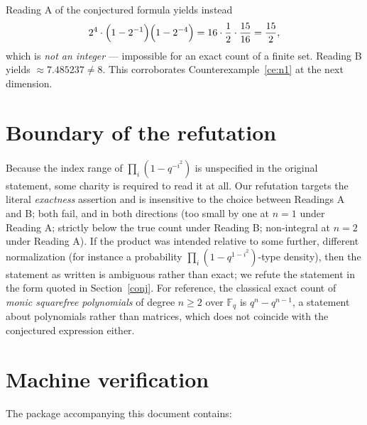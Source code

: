 \documentclass[11pt]{article}
\newcommand{\Fq}{\mathbb{F}_q}
\begin{document}
Reading A of the conjectured formula yields instead
\[
2^{4}\cdot\Bigl(1 - 2^{-1}\Bigr)\Bigl(1 - 2^{-4}\Bigr)
= 16 \cdot \frac12 \cdot \frac{15}{16} = \frac{15}{2},
\]
which is \emph{not an integer} --- impossible for an exact count of a finite
set. Reading B yields $\approx 7.485237 \neq 8$. This corroborates
Counterexample~\ref{ce:n1} at the next dimension.

\section{Boundary of the refutation}

Because the index range of $\prod_i(1 - q^{-i^2})$ is unspecified in the
original statement, some charity is required to read it at all. Our refutation
targets the literal \emph{exactness} assertion and is insensitive to the
choice between Readings A and B; both fail, and in both directions (too small
by one at $n = 1$ under Reading A; strictly below the true count under
Reading B; non-integral at $n = 2$ under Reading A). If the product was
intended relative to some further, different normalization (for instance a
probability $\prod_i (1 - q^{1 - i^2})$-type density), then the statement as
written is ambiguous rather than exact; we refute the statement in the form
quoted in Section~\ref{conj}. For reference, the classical exact count of
\emph{monic squarefree polynomials} of degree $n \ge 2$ over $\Fq$ is
$q^n - q^{n-1}$, a statement about polynomials rather than matrices, which
does not coincide with the conjectured expression either.

\section{Machine verification}

The package accompanying this document contains:
\end{document}
